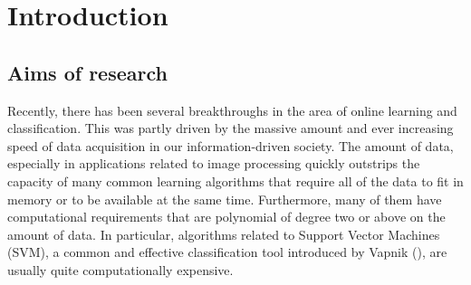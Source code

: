 

\chapter{Introduction}

\ifpdf
    \graphicspath{{1_introduction/figures/PNG/}{1_introduction/figures/PDF/}{1_introduction/figures/}}
\else
    \graphicspath{{1_introduction/figures/EPS/}{1_introduction/figures/}}
\fi







\section{Aims of research} %
Recently, there has been several breakthroughs in the area of online learning and classification. This was partly driven by the massive amount and ever increasing speed of data acquisition in our information-driven society. The amount of data, especially in applications related to image processing quickly outstrips the capacity of many common learning algorithms that require all of the data to fit in memory or to be available at the same time. Furthermore, many of them have computational requirements that are polynomial of degree two or above on the amount of data. In particular, algorithms related to Support Vector Machines (SVM), a common and effective classification tool introduced by Vapnik (\cite{Vapnik95}), are usually quite computationally expensive.

